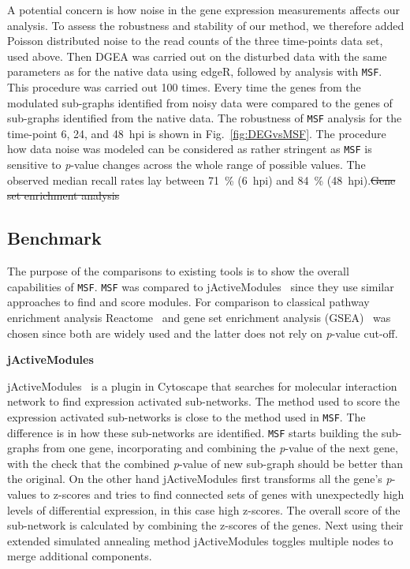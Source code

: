 \documentclass[10pt,a4paper,twocolumn]{article}
\begin{document}
	A potential concern is how noise in the gene expression
        measurements affects our analysis. To assess the robustness
        and stability of our method, we therefore added Poisson
        distributed noise to the read counts of the three time-points
        data set, used above. Then DGEA was carried out on the
        disturbed data with the same parameters as for the native data
        using edgeR, followed by analysis with \texttt{MSF}. This
        procedure was carried out 100 times.  Every time the genes
        from the modulated sub-graphs identified from noisy data were
        compared to the genes of sub-graphs identified from the native
        data. The robustness of \texttt{MSF} analysis for the
        time-point 6, 24, and 48~hpi is shown in
        Fig.~\ref{fig:DEGvsMSF}. The procedure how data noise was
        modeled can be considered as rather stringent as \texttt{MSF}
        is sensitive to \textit{p}-value changes across the whole
        range of possible values. The observed median recall rates lay
        between 71~\% (6~hpi) and 84~\% (48~hpi).\sout{Gene set enrichment analysis}
	
	\subsection*{Benchmark}
	
	 The purpose of the comparisons to existing tools is to show the overall capabilities of \texttt{MSF}. \texttt{MSF} was compared to jActiveModules~\cite{jActiveModules} since they use similar approaches to find and score modules. For comparison to classical pathway enrichment analysis Reactome~\cite{Reactome} and gene set enrichment analysis (GSEA)~\cite{Subramanian15545} was chosen since both are widely used and the latter does not rely on \textit{p}-value cut-off.
	
	\textbf{jActiveModules}
	
	jActiveModules~\cite{jActiveModules} is a plugin in Cytoscape that searches for molecular
        interaction network to find expression activated
        sub-networks. The method used to score the expression
        activated sub-networks is close to the method used in
        \texttt{MSF}. The difference is in how these sub-networks are identified. \texttt{MSF} starts building the sub-graphs from one gene, incorporating and combining the \textit{p}-value of the next gene, with the check that the combined \textit{p}-value of new sub-graph should be better than the original. On the other hand jActiveModules first transforms all the gene’s \textit{p}-values to z-scores and tries to find connected sets of genes with unexpectedly high levels of differential expression, in this case high z-scores. The overall score of the sub-network is calculated by combining the z-scores of the genes. Next using their extended simulated annealing method jActiveModules toggles multiple nodes to merge additional components. 
	
\end{document}
